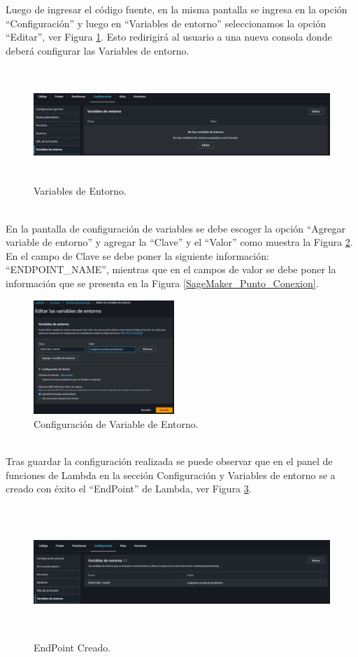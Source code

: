 \documentclass[a4paper,10pt, oneside, titlepage]{article}
\begin{document}
	\indent Luego de ingresar el código fuente, en la misma pantalla se ingresa en la opción ``Configuración'' y luego en ``Variables de entorno'' seleccionamos la opción ``Editar'', ver Figura \ref{Variables_Entorno}. Esto redirigirá al usuario a una nueva consola donde deberá configurar las Variables de entorno.
	\begin{figure}[!h]
		\centering
		\includegraphics[width = 1\linewidth, height = 4.3cm]{Variables_Entorno.png}
		\caption{Variables de Entorno.}
		\label{Variables_Entorno}
	\end{figure} \\
	\indent En la pantalla de configuración de variables se debe escoger la opción ``Agregar variable de entorno'' y agregar la ``Clave'' y el ``Valor'' como muestra la Figura \ref{Variable_EndPoint}. En el campo de Clave se debe poner la siguiente información: ``ENDPOINT\_NAME'', mientras que en el campos de valor se debe poner la información que se presenta en la Figura \ref{SageMaker_Punto_Conexion}.
	\begin{figure}[!h]
		\centering
		\includegraphics[width = 1\linewidth, height = 4.3cm]{Variable_EndPoint.png}
		\caption{Configuración de Variable de Entorno.}
		\label{Variable_EndPoint}
	\end{figure} \\
	\indent Tras guardar la configuración realizada se puede observar que en el panel de funciones de Lambda en la sección Configuración y Variables de entorno se a creado con éxito el ``EndPoint'' de Lambda, ver Figura \ref{EndPoint_Creado}.
	\begin{figure}[!h]
		\centering
		\includegraphics[width = 1\linewidth, height = 5cm]{EndPoint_Creado.png}
		\caption{EndPoint Creado.}
		\label{EndPoint_Creado}
	\end{figure} \\
\end{document}

